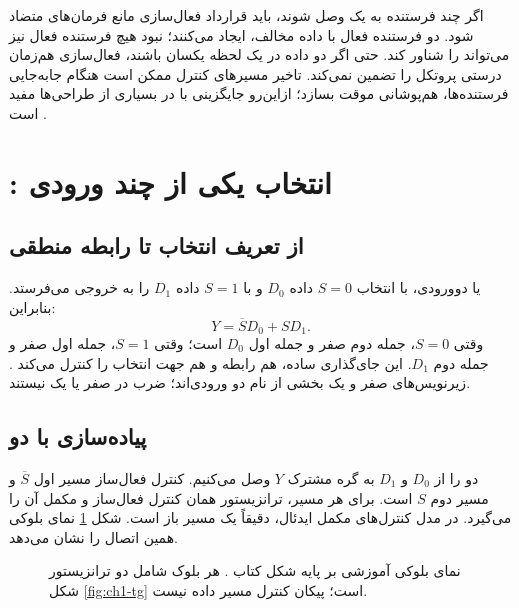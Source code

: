 اگر چند فرستنده به یک  وصل شوند، باید قرارداد فعال‌سازی مانع فرمان‌های
متضاد شود. دو فرستنده فعال با داده مخالف،  ایجاد می‌کنند؛
نبود هیچ فرستنده فعال نیز می‌تواند  را شناور کند.
حتی اگر دو داده در یک لحظه یکسان باشند، فعال‌سازی هم‌زمان درستی پروتکل را تضمین نمی‌کند.
تاخیر مسیرهای کنترل ممکن است هنگام جابه‌جایی فرستنده‌ها، هم‌پوشانی موقت بسازد؛
ازاین‌رو جایگزینی با  در بسیاری از طراحی‌ها مفید است
\cite[بخش ]{weste}.

\section{: انتخاب یکی از چند ورودی}
\label{sec:ch1-mux}
\subsection{از تعریف انتخاب تا رابطه منطقی}
 یا  دوورودی، با انتخاب \(S=0\) داده \(D_0\)
و با \(S=1\) داده \(D_1\) را به خروجی می‌فرستد. بنابراین:
\begin{equation}\label{eq:ch1-mux}
Y=\overline{S}D_0+SD_1.
\end{equation}
وقتی \(S=0\)، جمله دوم صفر و جمله اول \(D_0\) است؛ وقتی \(S=1\)،
جمله اول صفر و جمله دوم \(D_1\). این جای‌گذاری ساده، هم رابطه و هم جهت انتخاب
را کنترل می‌کند \cite[بخش ]{weste}.
زیرنویس‌های صفر و یک بخشی از نام دو ورودی‌اند؛ ضرب در صفر یا یک نیستند.

\subsection{پیاده‌سازی با دو }
دو  را از \(D_0\) و \(D_1\) به گره مشترک \(Y\) وصل می‌کنیم.
کنترل فعال‌ساز مسیر اول \(\overline{S}\) و مسیر دوم \(S\) است.
برای هر مسیر، ترانزیستور  همان کنترل فعال‌ساز و  مکمل آن
را می‌گیرد. در مدل کنترل‌های مکمل ایدئال، دقیقاً یک مسیر باز است.
شکل \ref{fig:ch1-mux} نمای بلوکی همین اتصال را نشان می‌دهد.

\begin{figure}[ht]
\centering
\begin{latin}
\end{latin}
\caption{نمای بلوکی آموزشی  بر پایه شکل  کتاب \cite{weste}.
هر بلوک  شامل دو ترانزیستور شکل \ref{fig:ch1-tg} است؛
پیکان کنترل مسیر داده نیست.}
\label{fig:ch1-mux}
\end{figure}

